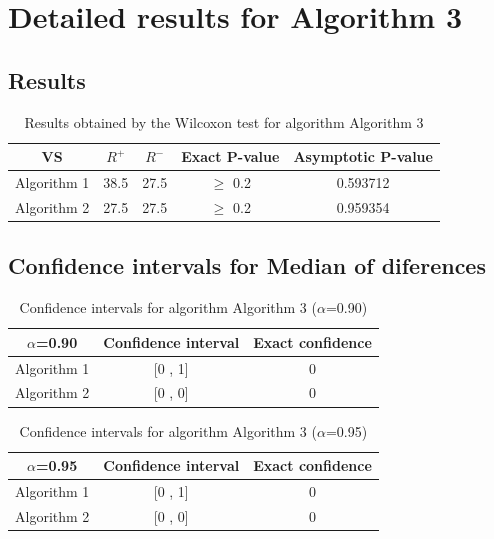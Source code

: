 \documentclass[a4paper,10pt]{article}
\begin{document}
 \clearpage 


\section{Detailed results for Algorithm 3}


\subsection{Results}

\begin{table}[!htp]
\centering\small
\begin{tabular}{
|c|c|c|c|c|}
\hline
 VS & $R^{+}$ & $R^{-}$ & Exact P-value & Asymptotic P-value \\ \hline 
Algorithm 1 & 38.5 & 27.5 & $\geq$ 0.2 & 0.593712\\ \hline 
Algorithm 2 & 27.5 & 27.5 & $\geq$ 0.2 & 0.959354\\ \hline 

\end{tabular}
\caption{Results obtained by the Wilcoxon test for algorithm Algorithm 3}
\end{table}

\subsection{Confidence intervals for Median of diferences}

\begin{table}[!htp]
\centering\small
\begin{tabular}{
|c|c|c|}
\hline
 $\alpha$=0.90 & Confidence interval & Exact confidence \\ \hline 
Algorithm 1 & [0 , 1] & 0\\ \hline 
Algorithm 2 & [0 , 0] & 0\\ \hline 

\end{tabular}
\caption{Confidence intervals for algorithm Algorithm 3 ($\alpha$=0.90)}
\end{table}
\begin{table}[!htp]
\centering\small
\begin{tabular}{
|c|c|c|}
\hline
 $\alpha$=0.95 & Confidence interval & Exact confidence \\ \hline 
Algorithm 1 & [0 , 1] & 0\\ \hline 
Algorithm 2 & [0 , 0] & 0\\ \hline 

\end{tabular}
\caption{Confidence intervals for algorithm Algorithm 3 ($\alpha$=0.95)}
\end{table}

 \clearpage 
\end{document}
